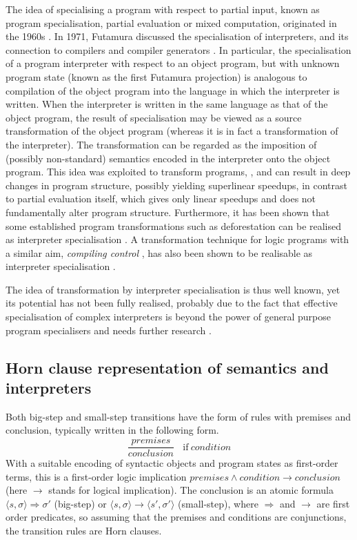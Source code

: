 \documentclass{llncs}
\begin{document}
The idea of specialising a program with respect to partial input,  known as program specialisation, partial evaluation or mixed computation, 
originated in the 1960s \cite{Lombardi,Ershov}.  In 1971, Futamura discussed the specialisation of interpreters, and its connection to compilers and compiler 
generators \cite{Futamura71}.  In particular, the specialisation of a program interpreter with respect to an object program,  but with unknown
program state (known as the first Futamura projection) is analogous to compilation of the object 
program into the language in which the interpreter is written.  
When the interpreter is written in the same language as that of the object program,
the result of specialisation may be viewed as a source transformation of the object program 
(whereas it is in fact a transformation of the interpreter). 
The transformation can be regarded as the imposition of (possibly non-standard) semantics encoded in the
interpreter onto the object program. 
This idea was exploited to transform programs, \cite{Gallagher,Turchin,Glueck,Jones,Giacobazzi}, and can result in deep changes in program structure, 
possibly yielding superlinear speedups, in contrast to partial evaluation itself, which gives only linear speedups and does not fundamentally alter program
structure.  Furthermore, it has been shown that some established program transformations such as deforestation
can be realised as interpreter specialisation \cite{Glueck}.  A transformation technique for logic programs with a similar 
aim, \emph{compiling control} \cite{BruynoogheDeS},
has also been shown to be realisable as interpreter specialisation \cite{Nys}.

The idea of transformation by interpreter specialisation is thus well known, yet its potential has not been fully realised, probably due to the 
fact that effective specialisation of complex interpreters is beyond the power of general purpose program specialisers and needs 
further research \cite{GallagherGlueck}.

\subsection{Horn clause representation of semantics and interpreters}

Both big-step and small-step transitions have the form of rules with premises and conclusion, typically written in the following form.
\[
\dfrac{\mathit{premises}} 
{\mathit{conclusion}} 
~~~~\mathrm{if }~ \mathit{condition}
\]
With a suitable encoding of syntactic objects and program states as first-order terms, this is a first-order logic implication
$\mathit{premises} \wedge \mathit{condition} \rightarrow \mathit{conclusion}$ 
(here $\rightarrow$ stands for logical implication).
The conclusion is an atomic formula
$\langle s, \sigma\rangle \Rightarrow \sigma'$ (big-step) or $\langle s, \sigma\rangle \rightarrow \langle s',\sigma'\rangle$ (small-step),
where $\Rightarrow$ and $\rightarrow$ are first order predicates, so assuming that the premises and conditions are conjunctions,
the transition rules are Horn clauses.
\end{document}
